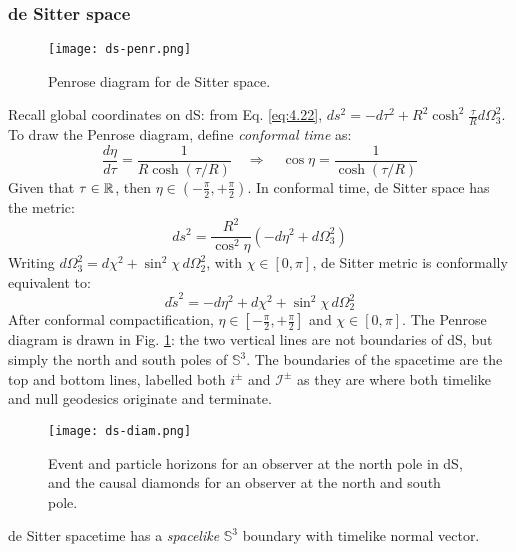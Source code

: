 \subsubsection{de Sitter space}

\begin{figure}
  \centering
  \texttt{[image: ds-penr.png]}
  \caption{Penrose diagram for de Sitter space.}
  \label{ds-penr}
\end{figure}

Recall global coordinates on dS: from Eq. \ref{eq:4.22}, $ ds^2 = -d\tau^2 + R^2 \cosh^2 \frac{\tau}{R} d\Omega_3^2 $. To draw the Penrose diagram, define \textit{conformal time} as:
\begin{equation*}
  \frac{d\eta}{d\tau} = \frac{1}{R \cosh (\tau / R)}
  \quad \Rightarrow \quad
  \cos \eta = \frac{1}{\cosh (\tau / R)}
\end{equation*}
Given that $ \tau \in \mathbb{R} $, then $ \eta \in \left( -\frac{\pi}{2}, +\frac{\pi}{2} \right) $. In conformal time, de Sitter space has the metric:
\begin{equation*}
  ds^2 = \frac{R^2}{\cos^2 \eta} \left( -d\eta^2 + d\Omega_3^2 \right)
\end{equation*}
Writing $ d\Omega_3^2 = d\chi^2 + \sin^2 \chi\, d\Omega_2^2 $, with $ \chi \in [0,\pi] $, de Sitter metric is conformally equivalent to:
\begin{equation*}
  d\tilde{s}^2 = -d\eta^2 + d\chi^2 + \sin^2 \chi\, d\Omega_2^2
\end{equation*}
After conformal compactification, $ \eta \in \left[ - \frac{\pi}{2}, + \frac{\pi}{2} \right] $ and $ \chi \in \left[ 0,\pi \right] $. The Penrose diagram is drawn in Fig. \ref{ds-penr}: the two vertical lines are not boundaries of dS, but simply the north and south poles of $ \mathbb{S}^3 $. The boundaries of the spacetime are the top and bottom lines, labelled both $ i^{\pm} $ and $ \mathcal{I}^{\pm} $ as they are where both timelike and null geodesics originate and terminate.

\begin{figure}
  \centering
  \texttt{[image: ds-diam.png]}
  \caption{Event and particle horizons for an observer at the north pole in dS, and the causal diamonds for an observer at the north and south pole.}
  \label{ds-diam}
\end{figure}

\begin{proposition}
  de Sitter spacetime has a \textit{spacelike} $ \mathbb{S}^3 $ boundary with timelike normal vector.
\end{proposition}

